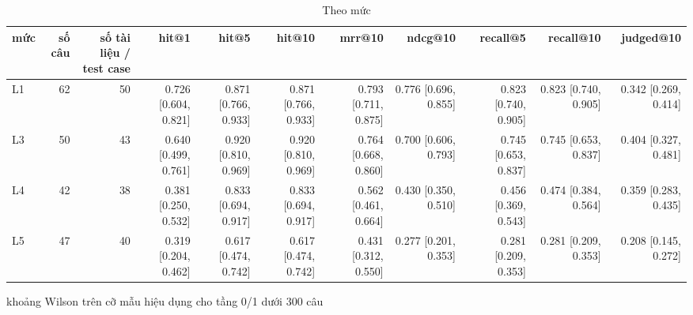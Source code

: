 \begin{table}[ht]
\centering
\caption{Theo mức}
\begin{tabular}{lrrrrrrrrrr}
\toprule
mức & số câu & số tài liệu / test case & hit@1 & hit@5 & hit@10 & mrr@10 & ndcg@10 & recall@5 & recall@10 & judged@10 \\
\midrule
L1 & 62 & 50 & 0.726 [0.604, 0.821] & 0.871 [0.766, 0.933] & 0.871 [0.766, 0.933] & 0.793 [0.711, 0.875] & 0.776 [0.696, 0.855] & 0.823 [0.740, 0.905] & 0.823 [0.740, 0.905] & 0.342 [0.269, 0.414] \\
L3 & 50 & 43 & 0.640 [0.499, 0.761] & 0.920 [0.810, 0.969] & 0.920 [0.810, 0.969] & 0.764 [0.668, 0.860] & 0.700 [0.606, 0.793] & 0.745 [0.653, 0.837] & 0.745 [0.653, 0.837] & 0.404 [0.327, 0.481] \\
L4 & 42 & 38 & 0.381 [0.250, 0.532] & 0.833 [0.694, 0.917] & 0.833 [0.694, 0.917] & 0.562 [0.461, 0.664] & 0.430 [0.350, 0.510] & 0.456 [0.369, 0.543] & 0.474 [0.384, 0.564] & 0.359 [0.283, 0.435] \\
L5 & 47 & 40 & 0.319 [0.204, 0.462] & 0.617 [0.474, 0.742] & 0.617 [0.474, 0.742] & 0.431 [0.312, 0.550] & 0.277 [0.201, 0.353] & 0.281 [0.209, 0.353] & 0.281 [0.209, 0.353] & 0.208 [0.145, 0.272] \\
\bottomrule
\end{tabular}
\par\smallskip\footnotesize khoảng Wilson trên cỡ mẫu hiệu dụng cho tầng 0/1 dưới 300 câu
\end{table}

